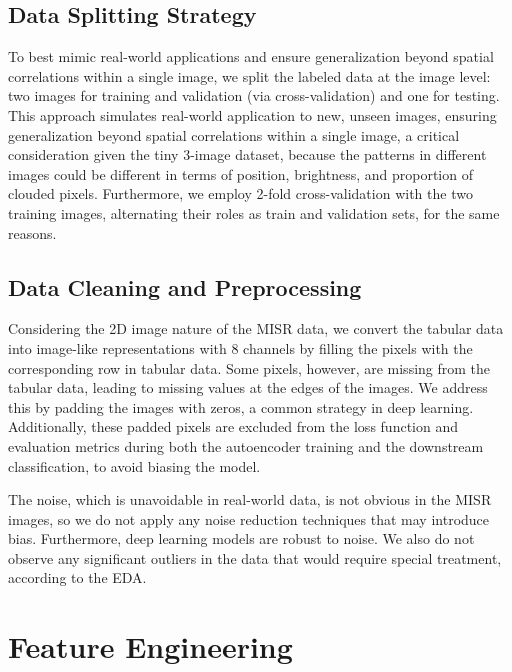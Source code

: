 \documentclass[10pt,letterpaper]{article}
\begin{document}

\subsection{Data Splitting Strategy}

To best mimic real-world applications and ensure generalization beyond spatial correlations within a single image, we split the labeled data at the image level: two images for training and validation (via cross-validation) and one for testing. This approach simulates real-world application to new, unseen images, ensuring generalization beyond spatial correlations within a single image, a critical consideration given the tiny 3-image dataset, because the patterns in different images could be different in terms of position, brightness, and proportion of clouded pixels. Furthermore, we employ 2-fold cross-validation with the two training images, alternating their roles as train and validation sets, for the same reasons.

\subsection{Data Cleaning and Preprocessing}

Considering the 2D image nature of the MISR data, we convert the tabular data into image-like representations with 8 channels by filling the pixels with the corresponding row in tabular data. Some pixels, however, are missing from the tabular data, leading to missing values at the edges of the images. We address this by padding the images with zeros, a common strategy in deep learning. Additionally, these padded pixels are excluded from the loss function and evaluation metrics during both the autoencoder training and the downstream classification, to avoid biasing the model.

The noise, which is unavoidable in real-world data, is not obvious in the MISR images, so we do not apply any noise reduction techniques that may introduce bias. Furthermore, deep learning models are robust to noise. We also do not observe any significant outliers in the data that would require special treatment, according to the EDA.

\section{Feature Engineering}
\end{document}
